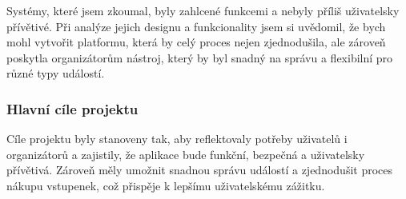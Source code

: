 \documentclass[12pt, a4paper,
twoside,        %
openright
]{report}
\begin{document}
Systémy, které jsem zkoumal, byly zahlcené funkcemi a nebyly příliš uživatelsky přívětivé. Při analýze jejich designu a funkcionality jsem si uvědomil, že bych mohl vytvořit platformu, která by celý proces nejen zjednodušila, ale zároveň poskytla organizátorům nástroj, který by byl snadný na správu a flexibilní pro různé typy událostí.

\subsubsection{Hlavní cíle projektu}

Cíle projektu byly stanoveny tak, aby reflektovaly potřeby uživatelů i organizátorů a zajistily, že aplikace bude funkční, bezpečná a uživatelsky přívětivá. Zároveň měly umožnit snadnou správu událostí a zjednodušit proces nákupu vstupenek, což přispěje k lepšímu uživatelskému zážitku.
\end{document}
